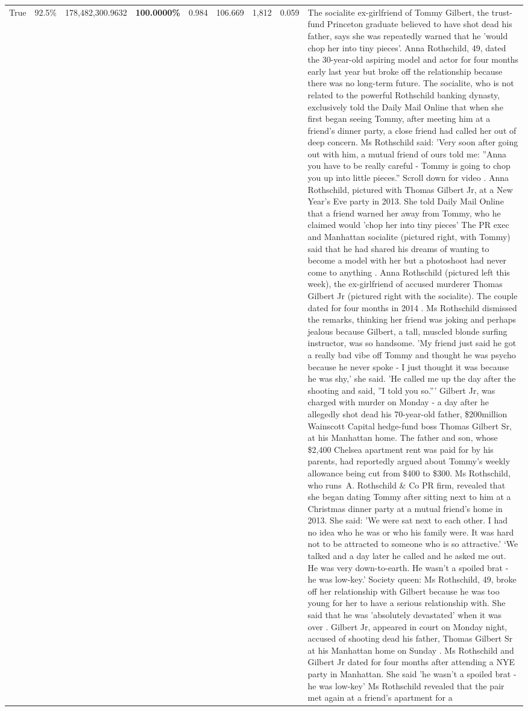 \begin{table}[H]
\begin{tabular}{lllrlllll}
True & 92.5\% & 178,482,300.9632 & \bfseries \color{red} 100.0000\% & 0.984 & 106.669 & 1,812 & 0.059 & The socialite ex-girlfriend of Tommy Gilbert, the trust-fund Princeton graduate believed to have shot dead his father, says she was repeatedly warned that he 'would chop her into tiny pieces'. Anna Rothschild, 49, dated the 30-year-old aspiring model and actor for four months early last year but broke off the relationship because there was no long-term future. The socialite, who is not related to the powerful Rothschild banking dynasty, exclusively told the Daily Mail Online that when she first began seeing Tommy, after meeting him at a friend's dinner party, a close friend had called her out of deep concern. Ms Rothschild said: 'Very soon after going out with him, a mutual friend of ours told me: ''Anna you have to be really careful - Tommy is going to chop you up into little pieces.'' Scroll down for video . Anna Rothschild, pictured with Thomas Gilbert Jr, at a New Year's Eve party in 2013. She told Daily Mail Online that a friend warned her away from Tommy, who he claimed would 'chop her into tiny pieces' The PR exec and Manhattan socialite (pictured right, with Tommy) said that he had shared his dreams of wanting to become a model with her but a photoshoot had never come to anything . Anna Rothschild (pictured left this week), the ex-girlfriend of accused murderer Thomas Gilbert Jr (pictured right with the socialite). The couple dated for four months in 2014 . Ms Rothschild dismissed the remarks, thinking her friend was joking and perhaps jealous because Gilbert, a tall, muscled blonde surfing instructor, was so handsome. 'My friend just said he got a really bad vibe off Tommy and thought he was psycho because he never spoke - I just thought it was because he was shy,' she said. 'He called me up the day after the shooting and said, ''I told you so.''' Gilbert Jr, was charged with murder on Monday - a day after he allegedly shot dead his 70-year-old father, \$200million Wainscott Capital hedge-fund boss Thomas Gilbert Sr, at his Manhattan home. The father and son, whose \$2,400 Chelsea apartment rent was paid for by his parents, had reportedly argued about Tommy's weekly allowance being cut from \$400 to \$300. Ms Rothschild, who runs A. Rothschild \& Co PR firm, revealed that she began dating Tommy after sitting next to him at a Christmas dinner party at a mutual friend's home in 2013. She said: 'We were sat next to each other. I had no idea who he was or who his family were. It was hard not to be attracted to someone who is so attractive.' ‘We talked and a day later he called and he asked me out. He was very down-to-earth. He wasn’t a spoiled brat - he was low-key.’ Society queen: Ms Rothschild, 49, broke off her relationship with Gilbert because he was too young for her to have a serious relationship with. She said that he was 'absolutely devastated' when it was over . Gilbert Jr, appeared in court on Monday night, accused of shooting dead his father, Thomas Gilbert Sr at his Manhattan home on Sunday . Ms Rothschild and Gilbert Jr dated for four months after attending a NYE party in Manhattan. She said 'he wasn't a spoiled brat - he was low-key' Ms Rothschild revealed that the pair met again at a friend’s apartment for a 
\end{tabular}
\end{table}
